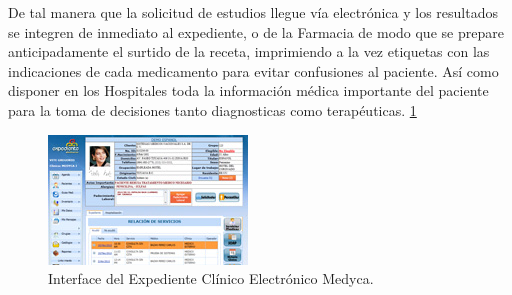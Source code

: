 De tal manera que la solicitud de estudios llegue vía electrónica y los resultados se integren de inmediato al expediente, o de la Farmacia de modo que se prepare anticipadamente el surtido de la receta, imprimiendo a la vez etiquetas con las indicaciones de cada medicamento para evitar confusiones al paciente.
Así como disponer en los Hospitales toda la información médica importante del paciente para la toma de decisiones tanto diagnosticas como terapéuticas. \cite{mediesel} \ref{figura7}
\begin{figure}
  \label{figura7}
  \centering
  \includegraphics[scale=1]{lib/assets/7}
  \caption{Interface del Expediente Clínico Electrónico Medyca.}
\end{figure}
